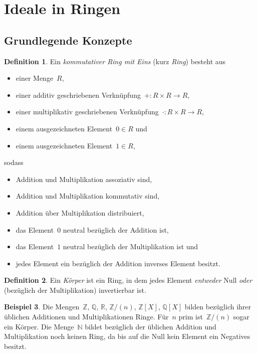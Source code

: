 \documentclass[a4paper,ngerman,12pt]{scrartcl}
\theoremstyle{definition}
\newtheorem{defn}{Definition}[section]
\newtheorem{bsp}[defn]{Beispiel}
\theoremstyle{plain}
\theoremstyle{remark}
\newcommand{\ZZ}{\mathbb{Z}}
\newcommand{\QQ}{\mathbb{Q}}
\newcommand{\RR}{\mathbb{R}}
\newcommand{\NN}{\mathbb{N}}
\renewcommand{\_}{\mathpunct{.}\,}
\newcommand{\?}{\,{:}\,}
\begin{document}

\appendix
\section{Ideale in Ringen}
\label{appendix:ideale}

\subsection{Grundlegende Konzepte}

\begin{defn}Ein \emph{kommutativer Ring mit Eins} (kurz \emph{Ring}) besteht aus
\begin{itemize}
\item einer Menge~$R$,
\item einer additiv geschriebenen Verknüpfung~${+} : R \times R \to R$,
\item einer multiplikativ geschriebenen Verknüpfung~${\cdot} : R \times R \to R$,
\item einem ausgezeichneten Element~$0 \in R$ und
\item einem ausgezeichneten Element~$1 \in R$,
\end{itemize}
sodass
\begin{itemize}
\item Addition und Multiplikation assoziativ sind,
\item Addition und Multiplikation kommutativ sind,
\item Addition über Multiplikation distribuiert,
\item das Element~$0$ neutral bezüglich der Addition ist,
\item das Element~$1$ neutral bezüglich der Multiplikation ist und
\item jedes Element ein bezüglich der Addition inverses Element besitzt.
\end{itemize}
\end{defn}

\begin{defn}Ein \emph{Körper} ist ein Ring, in dem jedes Element
\emph{entweder} Null \emph{oder} (bezüglich der Multiplikation) invertierbar
ist.\end{defn}

\begin{bsp}Die Mengen~$\ZZ$, $\QQ$, $\RR$, $\ZZ/(n)$, $\ZZ[X]$, $\QQ[X]$ bilden
bezüglich ihrer üblichen Additionen und Multiplikationen Ringe. Für~$n$ prim
ist~$\ZZ/(n)$ sogar ein Körper. Die Menge~$\NN$ bildet bezüglich der üblichen
Addition und Multiplikation noch keinen Ring, da bis auf die Null kein Element
ein Negatives besitzt.\end{bsp}
\end{document}
